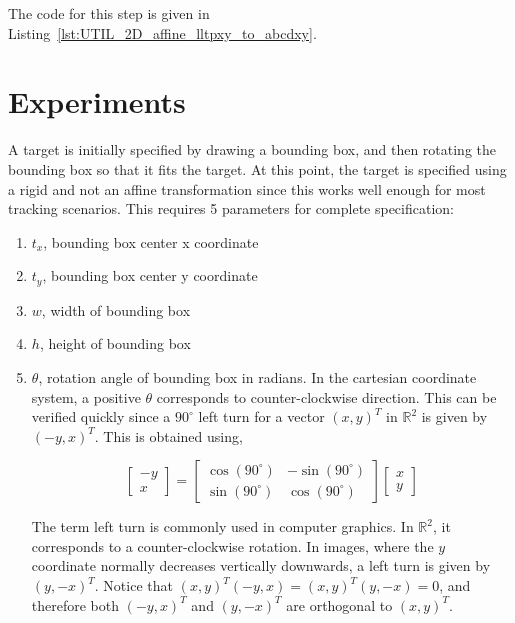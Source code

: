 The code for this step is given in Listing~\ref{lst:UTIL_2D_affine_lltpxy_to_abcdxy}.


\section{Experiments}
A target is initially specified by drawing a bounding box, and then rotating the bounding box so that it fits the target.  At this point, the target is specified using a rigid and not an affine transformation since this works well enough for most tracking scenarios.  This requires 5 parameters for complete specification:


\begin{enumerate}
\item $t_x$, bounding box center x coordinate
\item $t_y$, bounding box center y coordinate
\item $w$, width of bounding box
\item $h$, height of bounding box
\item $\theta$, rotation angle of bounding box in radians.  In the cartesian coordinate system, a positive $\theta$ corresponds to counter-clockwise direction.  This can be verified quickly since a $90^{\circ}$ left turn for a vector $(x,y)^T$ in $\mathbb{R}^2$ is given by $(-y,x)^T$.  This is obtained using,

\begin{equation}
\left[\begin{array}{ccc}
-y 
\\ 
x
\end{array}
\right]=
\left[
\begin{array}{ccc}
\cos(90^{\circ}) & -\sin(90^{\circ}) \\
\sin(90^{\circ}) & \cos(90^{\circ})
\end{array}
\right]
\left[\begin{array}{ccc}
x 
\\ 
y
\end{array}
\right]
\end{equation}


The term left turn is commonly used in computer graphics.  In  $\mathbb{R}^2$, it corresponds to a counter-clockwise rotation.  In images, where the $y$ coordinate normally decreases vertically downwards, a left turn is given by $(y,-x)^T$.  Notice that $(x,y)^T(-y,x) = (x,y)^T(y,-x) = 0$, and therefore both $ (-y,x)^T$ and $(y,-x)^T$ are orthogonal to $(x,y)^T$.
\end{enumerate}

